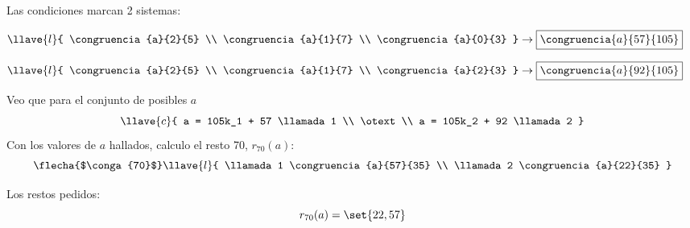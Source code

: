 Las condiciones marcan 2 sistemas:\\
\begin{minipage}{0.5\textwidth}
  \centering
  $
    \llave{l}{
      \congruencia{a}{2}{5} \\
      \congruencia{a}{1}{7} \\
      \congruencia{a}{0}{3}
    }
    \to \boxed{\congruencia{a}{57}{105} }
  $
\end{minipage}
\begin{minipage}{0.5\textwidth}
  \centering
  $\llave{l}{
      \congruencia{a}{2}{5} \\
      \congruencia{a}{1}{7} \\
      \congruencia{a}{2}{3}
    }
    \to \boxed{\congruencia{a}{92}{105} }
  $
\end{minipage}
Veo que para el conjunto de posibles $a$
$$
  \llave{c}{
    a = 105k_1 + 57 \llamada1 \\
    \otext                    \\
    a = 105k_2 + 92 \llamada2
  }
$$
Con los valores de $a$ hallados, calculo el resto 70, $r_{70}(a)$:
$$
  \flecha{$\conga{70}$}
  \llave{l}{
    \llamada1 \congruencia{a}{57}{35} \\
    \llamada2 \congruencia{a}{22}{35}
  }
$$

Los restos pedidos:
$$
  r_{70}(a) = \set{22, 57}
$$



\begin{aportes}
  \item {}
  \item {}
\end{aportes}

